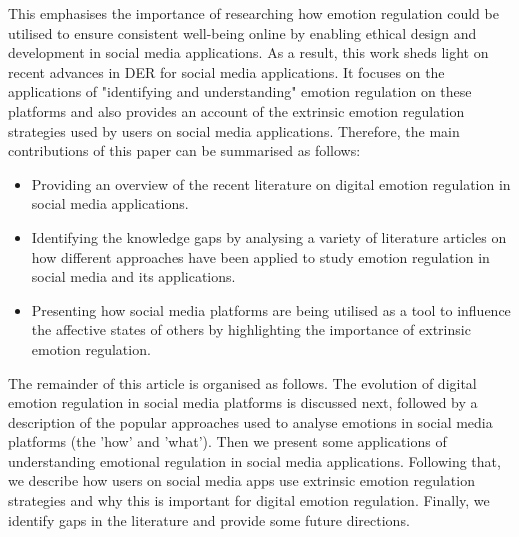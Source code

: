 \documentclass[lettersize,journal]{IEEEtran}
\begin{document}
This emphasises the importance of researching how emotion regulation could be utilised to ensure consistent well-being online by enabling ethical design and development in social media applications. As a result, this work sheds light on recent advances in DER for social media applications. It focuses on the applications of "identifying and understanding" emotion regulation on these platforms and also provides an account of the extrinsic emotion regulation strategies used by users on social media applications. Therefore, the main contributions of this paper can be summarised as follows:
\begin{itemize} 
    \item Providing an overview of the recent literature on digital emotion regulation in social media applications. 
    \item Identifying the knowledge gaps by analysing a variety of literature articles on how different approaches have been applied to study emotion regulation in social media and its applications.
    \item Presenting how social media platforms are being utilised as a tool to influence the affective states of others by highlighting the importance of extrinsic emotion regulation.

\end{itemize}

The remainder of this article is organised as follows. The evolution of digital emotion regulation in social media platforms is discussed next, followed by a description of the popular approaches used to analyse emotions in social media platforms (the 'how' and 'what'). Then we present some applications of understanding emotional regulation in social media applications. Following that, we describe how users on social media apps use extrinsic emotion regulation strategies and why this is important for digital emotion regulation. Finally, we identify gaps in the literature and provide some future directions.
  
\end{document}
